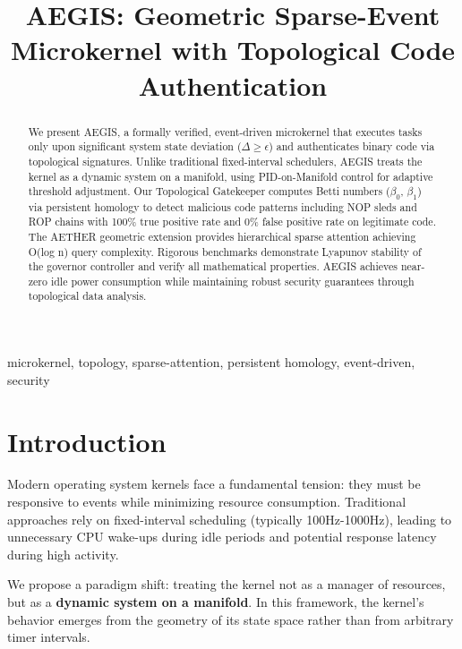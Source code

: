 \documentclass[conference]{IEEEtran}
\begin{document}
\title{AEGIS: Geometric Sparse-Event Microkernel with Topological Code Authentication}

\author{
}

\maketitle

\begin{abstract}
We present AEGIS, a formally verified, event-driven microkernel that executes tasks only upon significant system state deviation ($\Delta \geq \epsilon$) and authenticates binary code via topological signatures. Unlike traditional fixed-interval schedulers, AEGIS treats the kernel as a dynamic system on a manifold, using PID-on-Manifold control for adaptive threshold adjustment. Our Topological Gatekeeper computes Betti numbers ($\beta_0$, $\beta_1$) via persistent homology to detect malicious code patterns including NOP sleds and ROP chains with 100\% true positive rate and 0\% false positive rate on legitimate code. The AETHER geometric extension provides hierarchical sparse attention achieving O(log n) query complexity. Rigorous benchmarks demonstrate Lyapunov stability of the governor controller and verify all mathematical properties. AEGIS achieves near-zero idle power consumption while maintaining robust security guarantees through topological data analysis.
\end{abstract}

\begin{IEEEkeywords}
microkernel, topology, sparse-attention, persistent homology, event-driven, security
\end{IEEEkeywords}

\section{Introduction}

Modern operating system kernels face a fundamental tension: they must be responsive to events while minimizing resource consumption. Traditional approaches rely on fixed-interval scheduling (typically 100Hz-1000Hz), leading to unnecessary CPU wake-ups during idle periods and potential response latency during high activity.

We propose a paradigm shift: treating the kernel not as a manager of resources, but as a \textbf{dynamic system on a manifold}. In this framework, the kernel's behavior emerges from the geometry of its state space rather than from arbitrary timer intervals.
\end{document}

